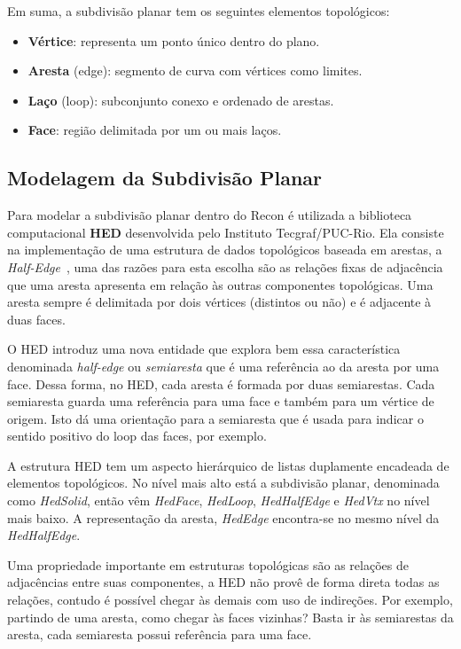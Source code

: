 Em suma, a subdivisão planar tem os seguintes elementos topológicos:
\renewcommand{\labelitemi}{•}
\begin{itemize}
  \item \textbf{Vértice}: representa um ponto único dentro do plano.
  \item \textbf{Aresta} (edge): segmento de curva com vértices como limites.
  \item \textbf{Laço} (loop): subconjunto conexo e ordenado de arestas.
  \item \textbf{Face}: região delimitada por um ou mais laços.
\end{itemize}

\subsection{Modelagem da Subdivisão Planar}

Para modelar a subdivisão planar dentro do Recon é utilizada a biblioteca computacional \textbf{HED} desenvolvida pelo Instituto Tecgraf/PUC-Rio. Ela consiste na implementação de uma estrutura de dados topológicos baseada em arestas, a \textit{Half-Edge}~\cite{HED}, uma das razões para esta escolha são as relações fixas de adjacência que uma aresta apresenta em relação às outras componentes topológicas. Uma aresta sempre é delimitada por dois vértices (distintos ou não) e é adjacente à duas faces.

O HED introduz uma nova entidade que explora bem essa característica denominada \textit{half-edge} ou \textit{semiaresta} que é uma referência ao  da aresta por uma face. Dessa forma, no HED, cada aresta é formada por duas semiarestas. Cada semiaresta guarda uma referência para uma face e também para um vértice de origem. Isto dá uma orientação para a semiaresta que é usada para indicar o sentido positivo do loop das faces, por exemplo.

A estrutura HED tem um aspecto hierárquico de listas duplamente encadeada de elementos topológicos. No nível mais alto está a subdivisão planar, denominada como \textit{HedSolid}, então vêm \textit{HedFace}, \textit{HedLoop}, \textit{HedHalfEdge} e \textit{HedVtx} no nível mais baixo. A representação da aresta, \textit{HedEdge} encontra-se no mesmo nível da \emph{HedHalfEdge}.

Uma propriedade importante em estruturas topológicas são as relações de adjacências entre suas componentes, a HED não provê de forma direta todas as relações, contudo é possível chegar às demais com uso de indireções. Por exemplo, partindo de uma aresta, como chegar às faces vizinhas? Basta ir às semiarestas da aresta, cada semiaresta possui referência para uma face.

